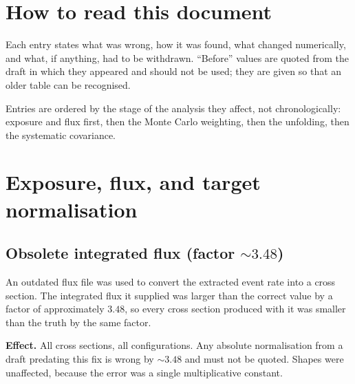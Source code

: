 \begin{titlepage}
\begin{abstract}
Three corrections changed physics conclusions rather than only normalisation, and the
conclusions they invalidated are marked as withdrawn here and in the analysis note: the
non-uniform-grid regularisation defect, which had collapsed several additional-smearing
matrices towards rank one; the beam-axis convention, under which reconstructed angular and
transverse observables were not the same quantities as the generator predictions they were
being compared against; and the double application of $A_C$ to the model predictions,
which invented a muon-angle anomaly.
\end{abstract}
\end{titlepage}

\tableofcontents
\clearpage

\section{How to read this document}

Each entry states what was wrong, how it was found, what changed numerically, and what, if
anything, had to be withdrawn.  ``Before'' values are quoted from the draft in
which they appeared and should not be used; they are given so that an older table can be
recognised.

Entries are ordered by the stage of the analysis they affect, not chronologically:
exposure and flux first, then the Monte Carlo weighting, then the unfolding, then the
systematic covariance.

\section{Exposure, flux, and target normalisation}

\subsection{Obsolete integrated flux (factor ${\sim}3.48$)}

An outdated flux file was used to convert the extracted event rate into a cross section.
The integrated flux it supplied was larger than the correct value by a factor of
approximately $3.48$, so every cross section produced with it was smaller than the truth
by the same factor.

\textbf{Effect.} All cross sections, all configurations.  Any absolute normalisation from
a draft predating this fix is wrong by ${\sim}3.48$ and must not be quoted.  Shapes were
unaffected, because the error was a single multiplicative constant.


